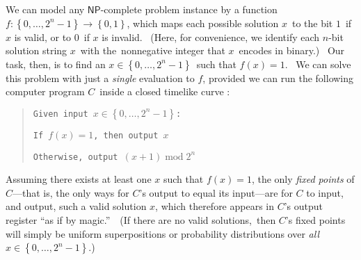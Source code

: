 \documentclass[12pt,onecolumn]{article}%
\begin{document}
We can model any $\mathsf{NP}$-complete problem instance by a function
$f:\left\{  0,\ldots,2^{n}-1\right\}  \rightarrow\left\{  0,1\right\}  $,
which maps each possible solution $x$\ to the bit $1$\ if $x$ is valid, or to
$0$\ if $x$ is invalid. \ (Here, for convenience, we identify each $n$-bit
solution string $x$\ with the\ nonnegative integer that $x$\ encodes in
binary.) \ Our task, then, is to find an $x\in\left\{  0,\ldots,2^{n}%
-1\right\}  $\ such that $f\left(  x\right)  =1$. \ We can solve this problem
with just a \textit{single} evaluation to $f$, provided we can run the
following computer program $C$\ inside a closed timelike curve
\cite{brun,aar:np,awat}:

\begin{quotation}
\texttt{Given input }$x\in\left\{  0,\ldots,2^{n}-1\right\}  $\texttt{:}

\texttt{If }$f\left(  x\right)  =1$\texttt{, then output }$x$

\texttt{Otherwise, output }$\left(  x+1\right)  \operatorname{mod}2^{n}$
\end{quotation}

Assuming there exists at least one $x$ such that $f\left(  x\right)  =1$, the
only \textit{fixed points} of $C$---that is, the only ways for $C$'s output to
equal its input---are for $C$ to input, and output, such a valid solution $x$,
which therefore appears in $C$'s output register \textquotedblleft as if by
magic.\textquotedblright\ \ (If there are no valid solutions,\ then $C$'s
fixed points will simply be uniform superpositions or probability
distributions over \textit{all} $x\in\left\{  0,\ldots,2^{n}-1\right\}  $.)
\end{document}

